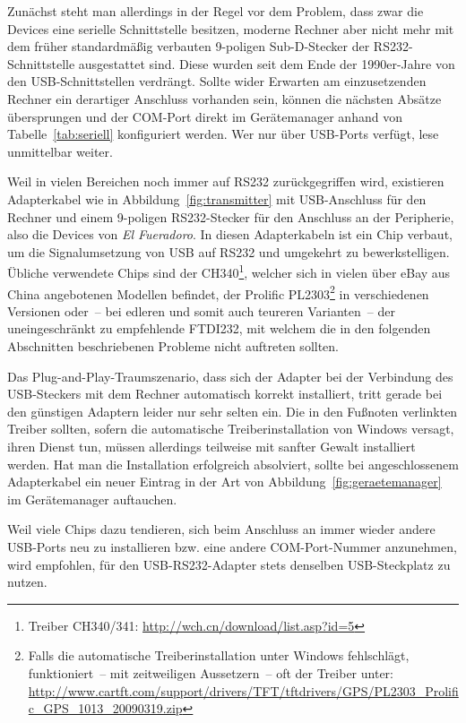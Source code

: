\documentclass[paper=a4, parskip, numbers=noenddot, toc=listof, headsepline]{scrbook}
\newcommand{\anlage}{\emph{El Fueradoro}}
\begin{document}
			Zunächst steht man allerdings in der Regel vor dem Problem, dass zwar die Devices eine serielle Schnittstelle besitzen, moderne Rechner aber nicht mehr mit dem früher standardmäßig verbauten 9-poligen Sub-D-Stecker der RS232-Schnittstelle ausgestattet sind. Diese wurden seit dem Ende der 1990er-Jahre von den USB-Schnittstellen verdrängt. Sollte wider Erwarten am einzusetzenden Rechner ein derartiger Anschluss vorhanden sein, können die nächsten Absätze übersprungen und der COM-Port direkt im Gerätemanager anhand von Tabelle~\ref{tab:seriell} konfiguriert werden. Wer nur über USB-Ports verfügt, lese unmittelbar weiter.

			Weil in vielen Bereichen noch immer auf RS232 zurückgegriffen wird, existieren Adapterkabel wie in Abbildung~\ref{fig:transmitter} mit USB-Anschluss für den Rechner und einem 9-poligen RS232-Stecker für den Anschluss an der Peripherie, also die Devices von {\anlage}. In diesen Adapterkabeln ist ein Chip verbaut, um die Signalumsetzung von USB auf RS232 und umgekehrt zu bewerkstelligen. Übliche verwendete Chips sind der CH340\footnote{Treiber CH340/341: \url{http://wch.cn/download/list.asp?id=5}}, welcher sich in vielen über eBay aus China angebotenen Modellen befindet, der Prolific PL2303\footnote{Falls die automatische Treiberinstallation unter Windows fehlschlägt, funktioniert~-- mit zeitweiligen Aussetzern~-- oft der Treiber unter: \url{http://www.cartft.com/support/drivers/TFT/tftdrivers/GPS/PL2303_Prolific_GPS_1013_20090319.zip}} in verschiedenen Versionen oder~-- bei edleren und somit auch teureren Varianten~-- der uneingeschränkt zu empfehlende FTDI232, mit welchem die in den folgenden Abschnitten beschriebenen Probleme nicht auftreten sollten.

			Das Plug-and-Play-Traum\-szenario, dass sich der Adapter bei der Verbindung des USB-Steckers mit dem Rechner automatisch korrekt installiert, tritt gerade bei den günstigen Adaptern leider nur sehr selten ein. Die in den Fußnoten verlinkten Treiber sollten, sofern die automatische Treiberinstallation von Windows versagt, ihren Dienst tun, müssen allerdings teilweise mit sanfter Gewalt installiert werden. Hat man die Installation erfolgreich absolviert, sollte bei angeschlossenem Adapterkabel ein neuer Eintrag in der Art von Abbildung~\ref{fig:geraetemanager} im Gerätemanager auftauchen.

			Weil viele Chips dazu tendieren, sich beim Anschluss an immer wieder andere USB-Ports neu zu installieren bzw. eine andere COM-Port-Nummer anzunehmen, wird empfohlen, für den USB-RS232-Adapter stets denselben USB-Steckplatz zu nutzen.
\end{document}
